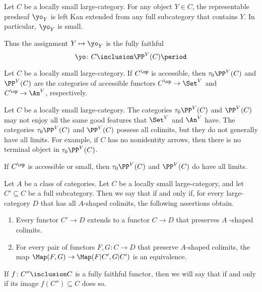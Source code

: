 \begin{eg}
	Let $ C $ be a locally small large-category.
	For any object $ Y \in C $,
	the representable presheaf $ \yo_Y $ is left Kan extended
	from any full subcategory that contains $ Y $.
	In particular, $ \yo_Y $ is small.

	Thus the assignment $ Y \mapsto \yo_Y $ is
	the fully faithful 
	\[ \yo \colon C \inclusion \PP^V(C) \period \]
\end{eg}

\begin{eg}
	Let $ C $ be a locally small large-category.
	If $ C^{\op} $ is accessible,
	then $ \tau_0\PP^V(C) $ and $ \PP^V(C) $
	are the categories of accessible functors
	$ C^{\op} \to \Set^V $ and $ C^{\op} \to \An^V $, respectively.
\end{eg}

\begin{nul}
	Let $ C $ be a locally small large-category.
	The categories $ \tau_0\PP^V(C) $ and $ \PP^V(C) $
	may not enjoy all the same good features that
	$ \Set^V $ and $ \An^V$ have.
	The categories $ \tau_0\PP^V(C) $ and $ \PP^V(C) $
	possess all colimits,
	but they do not generally have all limits.
	For example, if $C$ has no nonidentity arrows, then
	there is no terminal object in $ \tau_0\PP^V(C) $.
	
	If $ C^{\op} $ is accessible or small,
	then $ \tau_0\PP^V(C) $ and $ \PP^V(C) $ do have all limits.
\end{nul}

\begin{definition}
	Let $ A $ be a class of categories.
	Let $ C $ be a locally small large-category,
	and let $ C' \subseteq C $ be a full subcategory.
	Then we say that
	if and only if,
	for every large-category $ D $
	that has all $ A $-shaped colimits,
	the following assertions obtain.
	\begin{enumerate}
		\item Every functor $ C' \to D $ extends
			to a functor $ C \to D $
			that preserves $ A $ -shaped colimits.
		\item For every pair of functors
			$ F, G \colon C \to D $
			that preserve $ A $-shaped colimits,
			the map
			$ \Map(F, G) \to \Map(F|C', G|C' ) $
			is an equivalence.
	\end{enumerate}
	If $ f \colon C'' \inclusion C $ is a fully faithful functor,
	then we will say that
	if and only if its image $ f(C'') \subseteq C $ does so.
\end{definition}

